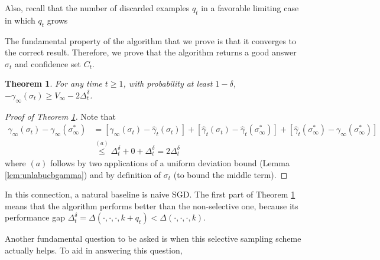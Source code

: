 \documentclass{colt2015} %
\newtheorem{thm}{Theorem}%
\newtheorem{lem}[thm]{Lemma}
\newcommand{\gamhat}{\hat{\gamma}}
\newcommand{\cO}{\mathcal{O}}
\newcommand{\lrb}[1]{\left[#1\right]}
\begin{document}
Also, recall that the number of discarded examples $q_t$ in a favorable limiting case in which $q_t$ grows

The fundamental property of the algorithm that we prove is that it converges to the correct result. 
Therefore, we prove that the algorithm returns a good answer $\sigma_t$ and confidence set $C_t$.  
\begin{thm}
\label{thm:algcorrect}
For any time $t \geq 1$, 
with probability at least $1-\delta$, $- \gamma_\infty (\sigma_t) \geq V_\infty - 2 \Delta_t^{\delta}$.
\end{thm}
\begin{proof}[Proof of Theorem \ref{thm:algcorrect}]
Note that 
\begin{align*}
\gamma_\infty (\sigma_t) - \gamma_\infty (\sigma_{\infty}^*) 
&= \lrb{ \gamma_\infty (\sigma_t) - \gamhat_t (\sigma_t) } 
+ \lrb{ \gamhat_t (\sigma_t) - \gamhat_t (\sigma_{\infty}^*) }
+ \lrb{ \gamhat_t (\sigma_{\infty}^*) - \gamma_\infty (\sigma_{\infty}^*) } \\
&\stackrel{(a)}{\leq } \Delta_t^{\delta} + 0 + \Delta_t^{\delta} = 2 \Delta_t^{\delta}
\end{align*}
where $(a)$ follows by two applications of a uniform deviation bound (Lemma \ref{lem:unlabucbgamma}) 
and by definition of $\sigma_t$ (to bound the middle term). 
\end{proof}

In this connection, a natural baseline is naive SGD. 
The first part of Theorem \ref{thm:algcorrect} means that the algorithm performs better than the non-selective one, 
because its performance gap $\Delta_t^{\delta} = \Delta (\cdot, \cdot, \cdot, k + q_t) < \Delta (\cdot, \cdot, \cdot, k)$.


Another fundamental question to be asked is when this selective sampling scheme actually helps. 
To aid in answering this question, 
\end{document}
